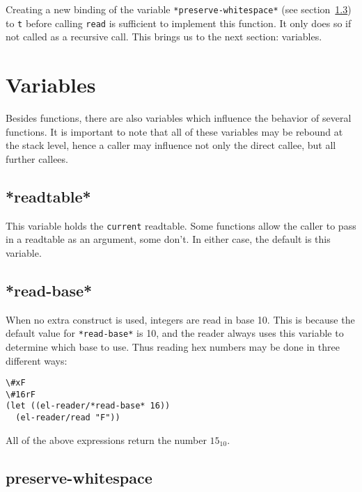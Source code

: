 \documentclass[a4paper,10pt,twoside]{report}
\newcommand{\sym}[1]{\texttt{#1}}
\newcommand{\fun}[1]{\texttt{#1}}
\newcommand{\Read}{\fun{read}}
\newcommand{\tee}{\sym{t}}
\begin{document}
Creating a new binding of the variable \sym{*preserve-whitespace*} (see
section~\ref{subsec:preserve-whitespace}) to \tee{} before calling \Read{} is
sufficient to implement this function.  It only does so if not called as a
recursive call.  This brings us to the next section: variables.

\section{Variables}
\label{sec:variables}

Besides functions, there are also variables which influence the behavior of
several functions.  It is important to note that all of these variables may be
rebound at the stack level, hence a caller may influence not only the direct
callee, but all further callees.

\subsection{*readtable*}
\label{subsec:readtable-var}

This variable holds the \texttt{current} readtable.  Some functions allow the
caller to pass in a readtable as an argument, some don’t.  In either case, the
default is this variable.

\subsection{*read-base*}
\label{subsec:read-base}

When no extra construct is used, integers are read in base 10.  This is because
the default value for \sym{*read-base*} is 10, and the reader always uses this
variable to determine which base to use.  Thus reading hex numbers may be done
in three different ways:

\begin{lstlisting}[style=lispinline]
\#xF
\#16rF
(let ((el-reader/*read-base* 16))
  (el-reader/read "F"))
\end{lstlisting}

All of the above expressions return the number \(15_{10}\).

\subsection{preserve-whitespace}
\label{subsec:preserve-whitespace}
\end{document}
